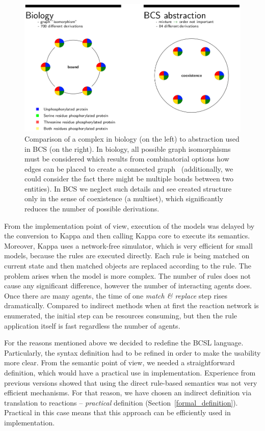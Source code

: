 \documentclass[12pt, twoside]{fithesis2} %
\begin{document}
\begin{figure}[!h]
\begin{center}
  \includegraphics[scale=0.35]{pics/abstraction}
\end{center}
\caption{Comparison of a complex in biology (on the left) to abstraction used in BCS (on the right). In biology, all possible graph isomorphisms must be considered which results from combinatorial options how edges can be placed to create a connected graph~\cite{Chartrand1985} (additionally, we could consider the fact there might be multiple bonds between two entities). In BCS we neglect such details and see created structure only in the sense of coexistence (a multiset), which significantly reduces the number of possible derivations.}\label{abstraction_comparision}
\end{figure}

From the implementation point of view, execution of the models was delayed by the conversion to Kappa and then calling Kappa core to execute its semantics. Moreover, Kappa uses a network-free simulator, which is very efficient for small models, because the rules are executed directly. Each rule is being matched on current state and then matched objects are replaced according to the rule. The problem arises when the model is more complex. The number of rules does not cause any significant difference, however the number of interacting agents does. Once there are many agents, the time of one \emph{match \& replace} step rises dramatically. Compared to indirect methods when at first the reaction network is enumerated, the initial step can be resources consuming, but then the rule application itself is fast regardless the number of agents.

For the reasons mentioned above we decided to redefine the BCSL language. Particularly, the syntax definition had to be refined in order to make the usability more clear. From the semantic point of view, we needed a straightforward definition, which would have a practical use in implementation. Experience from previous versions showed that using the direct rule-based semantics was not very efficient mechanisms. For that reason, we have chosen an indirect definition via translation to reactions -- \emph{practical} definition (Section~\ref{formal_definition}). Practical in this case means that this approach can be efficiently used in implementation.
\end{document}
